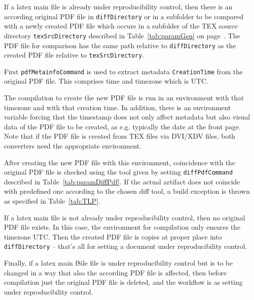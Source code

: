 If a latex main file is already under reproducibility control, 
then there is an according original PDF file in \texttt{diffDirectory} or in a subfolder 
to be compared with a newly created PDF file 
which occurs in a subfolder of the TEX source directory \texttt{texSrcDirectory} 
described in Table~\ref{tab:paramGen} on page~\pageref{tab:paramGen}. 
The PDF file for comparison has the same path relative to \texttt{diffDirectory} 
as the created PDF file relative to \texttt{texSrcDirectory}. 

First \texttt{pdfMetainfoCommand} is used 
to extract metadata \texttt{CreationTime} from the original PDF file. 
This comprises time and timezone which is UTC. 

The compilation to create the new PDF file is run in an environment 
with that timezone and with that creation time. 
In addition, there is an environment variable forcing 
that the timestamp does not only affect metadata but also visual data of the PDF file 
to be created, 
as e.g. typically the date at the front page. 
Note that if the PDF file is created from TEX files via DVI/XDV files, 
both converters need the appropriate environment. 

After creating the new PDF file with this environment, 
coincidence with the original PDF file is checked 
using the tool given by setting \texttt{diffPdfCommand} described in Table~\ref{tab:paramDiffPdf}. 
If the actual artifact does not coincide with predefined one 
according to the chosen diff tool, 
a build exception is thrown as specified in Table~\ref{tab:TLP}. 
\medskip


If a latex main file is not already under reproducibility control, 
then no original PDF file exists. 
In this case, the environment for compilation only ensures the timezone UTC. 
Then the created PDF file is copies at proper place into \texttt{diffDirectory} 
-- that's all for setting a document under reproducibility control. 

Finally, if a latex main f8ile file is under reproducibility control 
but is to be changed in a way that also the according PDF file is affected, 
then before compilation just the original PDF file is deleted, 
and the workflow is as setting under reproducibility control. 
\medskip


